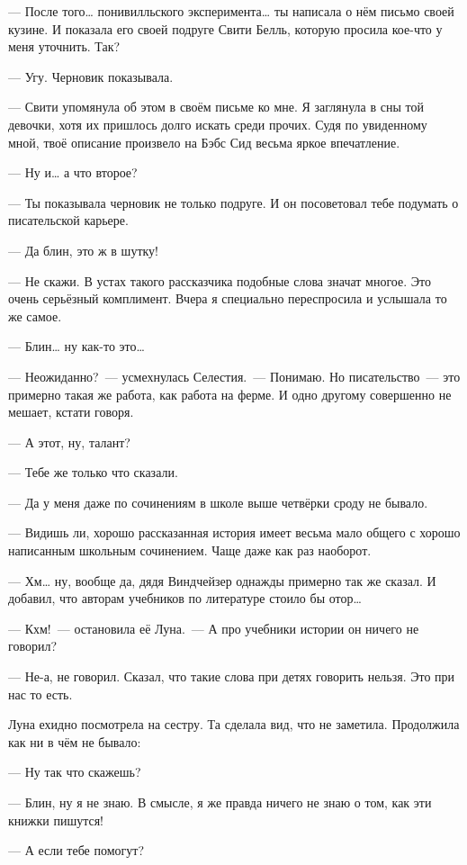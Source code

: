 \documentclass[fontsize=11pt,a5paper,titlepage=firstcover]{scrbook}
\begin{document}
--- После того{\ldots} понивилльского эксперимента{\ldots} ты написала о нём письмо своей кузине. И показала его своей подруге Свити Белль, которую просила кое-что у меня уточнить. Так?

--- Угу. Черновик показывала.

--- Свити упомянула об этом в своём письме ко мне. Я заглянула в сны той девочки, хотя их пришлось долго искать среди прочих. Судя по увиденному мной, твоё описание произвело на Бэбс Сид весьма яркое впечатление.

--- Ну и{\ldots} а что второе?

--- Ты показывала черновик не только подруге. И он посоветовал тебе подумать о писательской карьере.

--- Да блин, это ж в шутку!

--- Не скажи. В устах такого рассказчика подобные слова значат многое. Это очень серьёзный комплимент. Вчера я специально переспросила и услышала то же самое.

--- Блин{\ldots} ну как-то это{\ldots}

--- Неожиданно?~--- усмехнулась Селестия.~--- Понимаю. Но писательство~--- это примерно такая же работа, как работа на ферме. И одно другому совершенно не мешает, кстати говоря.

--- А этот, ну, талант?

--- Тебе же только что сказали.

--- Да у меня даже по сочинениям в школе выше четвёрки сроду не бывало.

--- Видишь ли, хорошо рассказанная история имеет весьма мало общего с хорошо написанным школьным сочинением. Чаще даже как раз наоборот.

--- Хм{\ldots} ну, вообще да, дядя Виндчейзер однажды примерно так же сказал. И добавил, что авторам учебников по литературе стоило бы отор{\ldots}

--- Кхм!~--- остановила её Луна.~--- А про учебники истории он ничего не говорил?

--- Не-а, не говорил. Сказал, что такие слова при детях говорить нельзя. Это при нас то есть.

Луна ехидно посмотрела на сестру. Та сделала вид, что не заметила. Продолжила как ни в чём не бывало:

--- Ну так что скажешь?

--- Блин, ну я не знаю. В смысле, я же правда ничего не знаю о том, как эти книжки пишутся!

--- А если тебе помогут?
\end{document}
